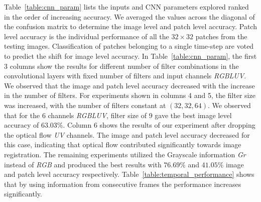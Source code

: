 \documentclass{article}
\begin{document}
Table~\ref{table:cnn_param} lists the inputs and CNN parameters explored ranked in the order of increasing accuracy. We averaged the values across the diagonal of the confusion matrix to determine the image level and patch level accuracy. Patch level accuracy is the individual performance of all the $32\times32$ patches from the testing images. Classification of patches belonging to a single time-step are voted to predict the shift for image level accuracy. In Table~\ref{table:cnn_param}, the first 3 columns show the results for different number of filter combinations in the convolutional layers with fixed number of filters and input channels \emph{RGBLUV}. We observed that the image  and patch level accuracy decreased with the increase in the number of filters. For experiments shown in columns 4 and 5, the filter size was increased, with the number of filters constant at $(32,32,64)$. We observed that for the 6 channels \emph{RGBLUV}, filter size of 9 gave the best image level accuracy of $63.03\%$. Column 6 shows the results of our experiment after dropping the optical flow \emph{UV} channels. The image and patch level accuracy decreased for this case, indicating that optical flow contributed significantly towards image registration. The remaining experiments utilized the Grayscale information \emph{Gr} instead of \emph{RGB} and produced the best results with $76.69\%$ and $41.05\%$ image and patch level accuracy respectively. Table~\ref{table:temporal_performance} shows that by using information from consecutive frames the performance increases significantly.



\end{document}
